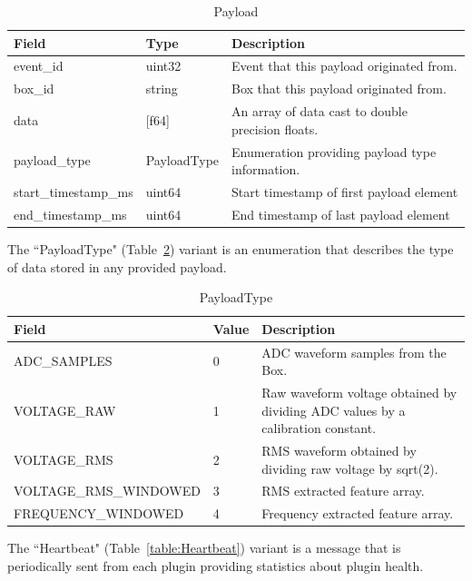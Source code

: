 \begin{table}[H]
	\centering
	\caption{Payload}
	\begin{tabularx}{\textwidth}{llX}
		\toprule
		\textbf{Field} & \textbf{Type} & \textbf{Description} \\
		\midrule
		event\_id & uint32 & Event that this payload originated from.  \\
		box\_id & string & Box that this payload originated from. \\
		data & [f64] & An array of data cast to double precision floats. \\
		payload\_type & PayloadType & Enumeration providing payload type information. \\
		start\_timestamp\_ms & uint64 & Start timestamp of first payload element \\
		end\_timestamp\_ms & uint64 & End timestamp of last payload element\\
		\bottomrule
	\end{tabularx}
	\label{table:Payload}
\end{table}

The ``PayloadType" (Table~\ref{table:PayloadType}) variant is an enumeration that describes the type of data stored in any provided payload.

\begin{table}[H]
	\centering
	\caption{PayloadType}
	\begin{tabularx}{\textwidth}{XlX}
		\toprule
		\textbf{Field} & \textbf{Value} & \textbf{Description} \\
		\midrule
		ADC\_SAMPLES & 0 & ADC waveform samples from the Box.  \\
		VOLTAGE\_RAW & 1 & Raw waveform voltage obtained by dividing ADC values by a calibration constant. \\
		VOLTAGE\_RMS & 2 & RMS waveform obtained by dividing raw voltage by sqrt(2). \\
		VOLTAGE\_RMS\_WINDOWED & 3 & RMS extracted feature array. \\
		FREQUENCY\_WINDOWED & 4 & Frequency extracted feature array. \\
		\bottomrule
	\end{tabularx}
	\label{table:PayloadType}
\end{table}

The ``Heartbeat" (Table~\ref{table:Heartbeat}) variant is a message that is periodically sent from each plugin providing statistics about plugin health.

